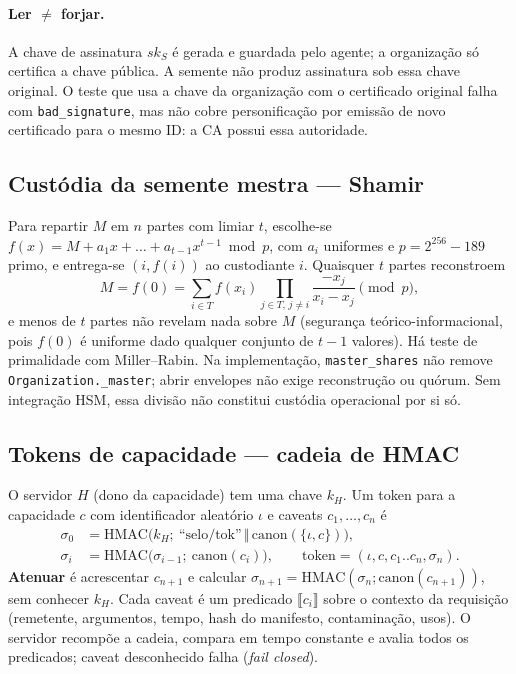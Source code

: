 \documentclass[11pt,a4paper]{article}
\theoremstyle{plain}
\theoremstyle{definition}
\theoremstyle{remark}
\newcommand{\HMAC}{\mathrm{HMAC}}
\newcommand{\cat}{\,\Vert\,}
\newcommand{\cod}[1]{\texttt{#1}}
\begin{document}
\paragraph{Ler $\neq$ forjar.} A chave de assinatura $sk_S$ é gerada e guardada pelo agente; a organização só certifica a chave pública. A semente não produz assinatura sob essa chave original. O teste que usa a chave da organização com o certificado original falha com \cod{bad\_signature}, mas não cobre personificação por emissão de novo certificado para o mesmo ID: a CA possui essa autoridade.

\subsection{Custódia da semente mestra --- Shamir}

Para repartir $M$ em $n$ partes \cite{shamir} com limiar $t$, escolhe-se $f(x)=M+a_1x+\dots+a_{t-1}x^{t-1}\bmod p$, com $a_i$ uniformes e $p=2^{256}-189$ primo, e entrega-se $(i,f(i))$ ao custodiante $i$. Quaisquer $t$ partes reconstroem
\begin{equation}
M=f(0)=\sum_{i\in T} f(x_i)\prod_{j\in T,\,j\ne i}\frac{-x_j}{x_i-x_j}\pmod p,
\end{equation}
e menos de $t$ partes não revelam nada sobre $M$ (segurança teórico-informacional, pois $f(0)$ é uniforme dado qualquer conjunto de $t-1$ valores). Há teste de primalidade com Miller--Rabin. Na implementação, \cod{master\_shares} não remove \cod{Organization.\_master}; abrir envelopes não exige reconstrução ou quórum. Sem integração HSM, essa divisão não constitui custódia operacional por si só.

\subsection{Tokens de capacidade --- cadeia de HMAC}

O servidor $H$ (dono da capacidade) tem uma chave $k_H$. Um token para a capacidade $c$ com identificador aleatório $\iota$ e caveats $c_1,\dots,c_n$ é
\begin{align}
\sigma_0 &= \HMAC\big(k_H;\ \text{``selo/tok''}\cat\mathrm{canon}(\{\iota,c\})\big),\\
\sigma_i &= \HMAC\big(\sigma_{i-1};\ \mathrm{canon}(c_i)\big),\qquad \text{token}=(\iota,c,c_1..c_n,\sigma_n).
\end{align}
\textbf{Atenuar} é acrescentar $c_{n+1}$ e calcular $\sigma_{n+1}=\HMAC(\sigma_n;\mathrm{canon}(c_{n+1}))$, sem conhecer $k_H$. Cada caveat é um predicado $\llbracket c_i\rrbracket$ sobre o contexto da requisição (remetente, argumentos, tempo, hash do manifesto, contaminação, usos). O servidor recompõe a cadeia, compara em tempo constante e avalia todos os predicados; caveat desconhecido falha (\emph{fail closed}).
\end{document}
